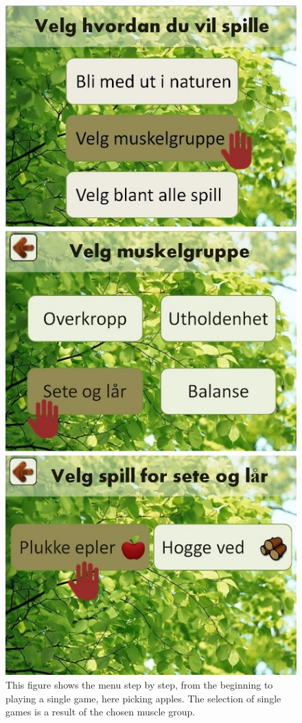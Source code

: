 \begin{figure} [H]
\centering
\includegraphics[scale=0.45]{menuStep1.jpg}
\caption[Menu review -  part one]{This figure shows the menu step by step, from the beginning to playing a single game, here picking apples. The selection of single games is a result of the chosen muscle group.}
\label{menu1}
\end{figure}

